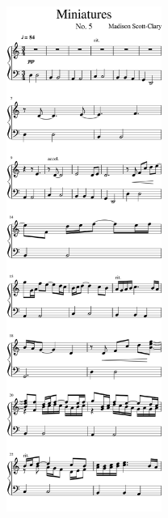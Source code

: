 \begin{paracol}{2}
\begin{rightcolumn*}
\noindent\includegraphics[width=2in]{assets/static/miniatures/5-1.png}


\end{rightcolumn*}
\end{paracol}
